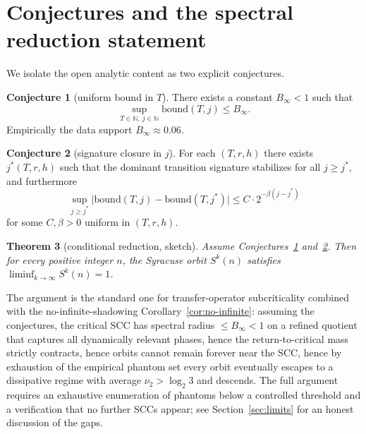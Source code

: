 \documentclass[11pt,a4paper]{article}
\newtheorem{theorem}{Theorem}
\theoremstyle{definition}
\newtheorem{conjecture}[theorem]{Conjecture}
\newcommand{\N}{\mathbb{N}}
\begin{document}
\section{Conjectures and the spectral reduction statement}
\label{sec:reduction}

We isolate the open analytic content as two explicit conjectures.

\begin{conjecture}[uniform bound in $T$]\label{conj:T}
There exists a constant $B_\infty < 1$ such that
\[
\sup_{T \in \N,\ j \in \N} \mathrm{bound}(T, j) \le B_\infty.
\]
Empirically the data support $B_\infty \approx 0.06$.
\end{conjecture}

\begin{conjecture}[signature closure in $j$]\label{conj:j}
For each $(T, r, h)$ there exists $j^*(T, r, h)$ such that the
dominant transition signature stabilizes for all $j \ge j^*$, and
furthermore
\[
\sup_{j \ge j^*}
\bigl|\mathrm{bound}(T, j) - \mathrm{bound}(T, j^*)\bigr|
\le C \cdot 2^{-\beta(j - j^*)}
\]
for some $C, \beta > 0$ uniform in $(T, r, h)$.
\end{conjecture}

\begin{theorem}[conditional reduction, sketch]\label{thm:conditional}
Assume Conjectures~\ref{conj:T} and~\ref{conj:j}. Then for every
positive integer $n$, the Syracuse orbit $S^k(n)$ satisfies
$\liminf_{k\to\infty} S^k(n) = 1$.
\end{theorem}

The argument is the standard one for transfer-operator subcriticality
combined with the no-infinite-shadowing
Corollary~\ref{cor:no-infinite}: assuming the conjectures, the
critical SCC has spectral radius $\le B_\infty < 1$ on a refined
quotient that captures all dynamically relevant phases, hence the
return-to-critical mass strictly contracts, hence orbits cannot
remain forever near the SCC, hence by exhaustion of the empirical
phantom set every orbit eventually escapes to a dissipative regime
with average $\nu_2 > \log_2 3$ and descends. The full argument
requires an exhaustive enumeration of phantoms below a controlled
threshold and a verification that no further SCCs appear; see
Section~\ref{sec:limits} for an honest discussion of the gaps.
\end{document}
